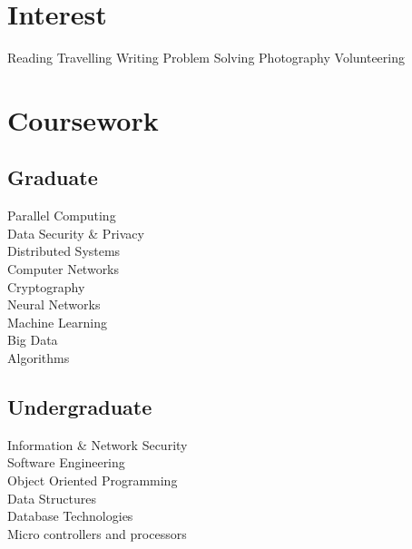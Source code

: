 \documentclass[]{main}
\begin{document}
\begin{minipage}[t]{0.25\textwidth} 


\section{Interest}
                    Reading 
    \textbullet{}   Travelling
    \textbullet{}   Writing 
    \textbullet{}   Problem Solving
    \textbullet{}   Photography
    \textbullet{}   Volunteering
\sectionsep


\section{Coursework}

\subsection{Graduate}
\sectionsep
Parallel Computing\\
Data Security \& Privacy\\
Distributed Systems\\
Computer Networks\\
Cryptography\\
Neural Networks\\
Machine Learning\\
Big Data\\
Algorithms\\
\sectionsep

\subsection{Undergraduate}
\sectionsep
Information \& Network Security\\
Software Engineering\\
Object Oriented Programming\\
Data Structures\\
Database Technologies\\
Micro controllers and processors\\
\sectionsep



\end{minipage} 
\end{document}
